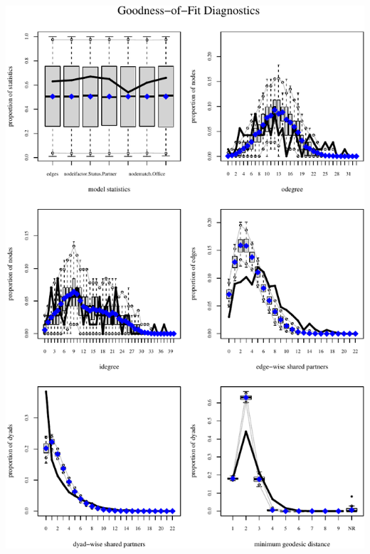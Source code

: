 \documentclass[
]{article}
\begin{document}
\begin{center}\includegraphics{46062_files/figure-latex/gof_plots-1} \end{center}
\end{document}
